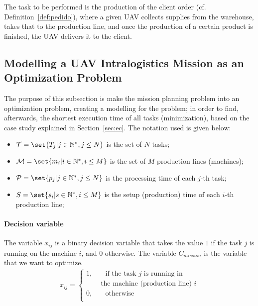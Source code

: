 \documentclass[conference,harvard,brazil,english]{sbatex}
\begin{document}
The task to be performed is the production of the client order (cf. Definition~\ref{def:pedido}), where a given UAV collects supplies from the warehouse, takes that to the production line, and once the production of a certain product is finished, the UAV delivers it to the client.

\subsection{Modelling a UAV Intralogistics Mission as an Optimization Problem }
\label{ssec:modelo}

The purpose of this subsection is make the mission planning problem into an optimization problem, creating a modelling for the problem; in order to find, afterwards, the shortest execution time of all tasks (minimization), based on the case study explained in Section~\ref{sec:ec}. The notation used is given below:

\begin{itemize}
\item $\mathcal{T} = \set{T_j \vert j\in \mathbb{N}^{*},j\leq N}$ is the set of $N$ tasks;
\item $\mathcal{M} = \set{m_i \vert i\in \mathbb{N}^{*},i\leq M}$ is the set of $M$ production lines (machines);
\item $\mathcal{P} = \set{p_j \vert j\in \mathbb{N}^{*},j\leq N}$ is the processing time of each $j$-th task;
\item $S = \set{s_i \vert s\in \mathbb{N}^{*},i\leq M}$  is the setup (production) time of each $i$-th production line;
\end{itemize}

\paragraph{Decision variable}

The variable $x_{ij}$ is a binary decision variable that takes the value $1$ if the task $j$ is running on the machine $i$, and $0$ otherwise. The variable $C_ {mission}$ is the variable that we want to optimize.
%
\begin{equation}
\label{eq:decision}
\begin{split}
x_{ij}=\begin{cases}
    1,       & \quad \text{if the task } j \text{ is running in} \\
 &\text{ the machine (production line) }i\\
    0,  & \quad \text{otherwise}\\
  \end{cases}
\end{split}
\end{equation}
\end{document}
